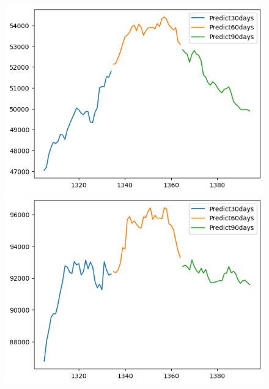 \begin{figure}[H]
    \hfill
        \begin{minipage}{0.15\textwidth}
    \centering
    \includegraphics[width=1\textwidth]{resources/chapter-5/newdata1/predicted/BIDV_NBeats_9-1_30days.png}
    \end{minipage}
    \hfill
    \begin{minipage}{0.15\textwidth}
    \centering
    \includegraphics[width=1\textwidth]{resources/chapter-5/newdata1/predicted/VCB_NBeats_7-3_30days.png}
    \end{minipage}
    \hfill
    \begin{minipage}{0.15\textwidth}
    \centering

\end{minipage}
\end{figure}
